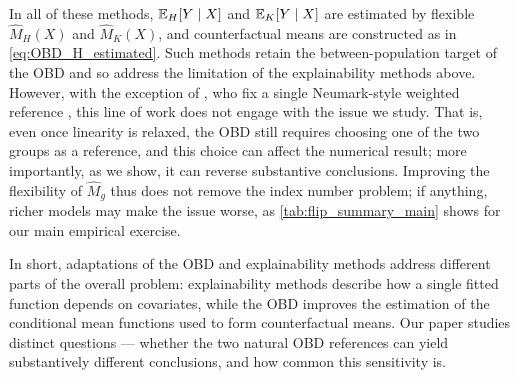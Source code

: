 In all of these methods, $\mathbb{E}_H[Y \mid X]$ and $\mathbb{E}_K[Y \mid X]$ are estimated by flexible $\hat{M}_H(X)$ and $\hat{M}_K(X)$, and counterfactual means are constructed as in \cref{eq:OBD_H_estimated}.
Such methods retain the between-population target of the OBD and so address the limitation of the explainability methods above.
However, with the exception of \citet{flachaire2025decomposing}, who fix a single Neumark-style weighted reference \citep{neumark1988}, this line of work does not engage with the issue we study.
That is, even once linearity is relaxed, the OBD still requires choosing one of the two groups as a reference, and this choice can affect the numerical result; more importantly, as we show, it can reverse substantive conclusions.
Improving the flexibility of $\hat{M}_g$ thus does not remove the index number problem; if anything, richer models may make the issue worse, as \cref{tab:flip_summary_main} shows for our main empirical exercise.

In short, adaptations of the OBD and explainability methods address different parts of the overall problem: explainability methods describe how a single fitted function depends on covariates, while the OBD improves the estimation of the conditional mean functions used to form counterfactual means.
Our paper studies distinct questions --- whether the two natural OBD references can yield substantively different conclusions, and how common this sensitivity is.
